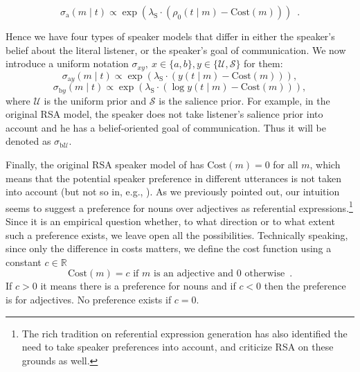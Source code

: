 \begin{equation} \label{Bayesian_speaker_action}
\sigma_\mathrm{a}(m \mid t) \propto \exp(\lambda_\mathrm{S} \cdot (\rho_0(t\mid m)-\mbox{Cost}(m))) \enspace .
\end{equation}

Hence we have four types of speaker models that differ in either the speaker's belief about the literal listener, or the speaker's goal of communication. We now introduce a uniform notation $\sigma_{xy},\ x\in\{a,b\},y\in\{\mathcal{U},\mathcal{S}\}$ for them:
\begin{equation} \label{Bayesian_speaker_uniform_action}
\sigma_{\mathrm{a}y}(m \mid t) \propto \exp(\lambda_\mathrm{S} \cdot ( y(t\mid m)-\mbox{Cost}(m))),
\end{equation}
\begin{equation} \label{Bayesian_speaker_uniform_belief}
\sigma_{\mathrm{b}y}(m \mid t) \propto \exp(\lambda_\mathrm{S} \cdot (\log y(t\mid m)-\mbox{Cost}(m))),
\end{equation}
where $\mathcal{U}$ is the uniform prior and $\mathcal{S}$ is the
salience prior. For example, in the original RSA model, the speaker
does not take listener's salience prior into account and he has a
belief-oriented goal of communication. Thus it will be denoted as
$\sigma_{\mathrm{b}\mathcal{U}}$.

Finally, the original RSA speaker model of \cite{Frank} has
$\mbox{Cost}(m)=0$ for all $m$, which means that the potential speaker
preference in different utterances is not taken into account (but not
so in, e.g., \cite{Bergen2012}). As we previously pointed out, our
intuition seems to suggest a preference for nouns over adjectives as
referential expressions.\footnote{The rich tradition on referential
  expression generation \cite{KramerDeemter2012:Computational-G} has
  also identified the need to take speaker preferences into account,
  and \cite{GattGompel2013:Are-we-Bayesian} criticize RSA on these
  grounds as well.} Since it is an empirical question whether, to what
direction or to what extent such a preference exists, we leave open
all the possibilities. Technically speaking, since only the difference
in costs matters, we define the cost function using a constant $c\in
\mathbb{R}$
\begin{equation} \label{cost}
\mbox{Cost}(m)=c \mbox{ if } m \mbox{ is an adjective and }0 \mbox{ otherwise} \enspace . 
\end{equation}
If $c>0$ it means there is a preference for nouns and if $c<0$ then the preference is for adjectives. No preference exists if $c=0$.

